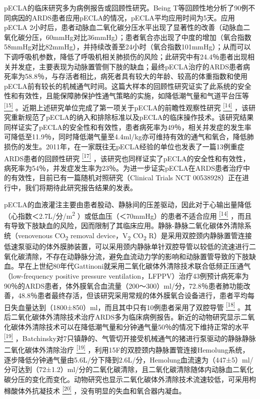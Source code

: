pECLA的临床研究多为病例报告或回顾性研究。Being
T等回顾性地分析了90例不同病因的ARDS患者应用pECLA的情况，pECLA平均应用时间为5天。应用pECLA
2小时后，患者动脉血二氧化碳分压水平出现了显著性的改善（动脉血二氧化碳分压，60mmHg对比36mmHg）；患者氧合亦出现了中度的增加（氧合指数58mmHg对比82mmHg），并持续改善至24小时（氧合指数101mmHg）；从而可以下调呼吸机参数，降低了呼吸机相关肺损伤的风险；此研究中有24.4％患者出现相关并发症，主要表现为动脉置管侧下肢的缺血；最终pECLA治疗的ARDS患者病死率为58.8％，与存活者相比，病死者具有较大的年龄、较高的体重指数和使用pECLA前有较长的机械通气时间。这篇大样本的回顾性研究证实了此系统的安全性和有效性，且能保障肺保护性通气策略的实施，如降低潮气量和气道平台压等
\protect\hyperlink{text00030.htmlux5cux23ch15-29}{\textsuperscript{{[}15{]}}}
。近期上述研究单位完成了第一项关于pECLA的前瞻性观察性研究
\protect\hyperlink{text00030.htmlux5cux23ch14-29}{\textsuperscript{{[}14{]}}}
，该研究重新规范了pECLA的纳入和排除标准以及pECLA的临床操作技术。该研究结果同样证实了pECLA的安全性和有效性，患者病死率为49％，相关并发症的发生率可降低至11.9％，同时降低潮气量至4.4ml/kg亦可维持有效的通气和氧合，降低肺损伤的发生。2011年，在一家既往无pECLA经验的单位也发表了一篇13例重症ARDS患者的回顾性研究
\protect\hyperlink{text00030.htmlux5cux23ch17-29}{\textsuperscript{{[}17{]}}}
，该研究也同样证实了pECLA的安全性和有效性，病死率为54％，并发症发生率为23％。为进一步证实pECLA在ARDS患者治疗中的有效性，目前已有一篇随机对照研究（Clinical
Trials NCT 00538928）正在进行中，我们将期待此研究报告结果的发表。

pECLA的血液灌注主要由患者股动、静脉间的压差驱动，因此对于心输出量降低（心指数＜2.7L/分/m\textsuperscript{2}
）或低血压（＜70mmHg）的患者不适合应用
\protect\hyperlink{text00030.htmlux5cux23ch14-29}{\textsuperscript{{[}14{]}}}
，而且有导致下肢缺血的风险，因而限制了其临床应用。静脉-静脉二氧化碳体外清除系统（venovenous
CO\textsubscript{2} removal device，V\textsubscript{2}
CO\textsubscript{2}
R）是采用双腔颈内静脉置管连接低速泵驱动的体外膜肺装置，可以采用颈内静脉单针双腔导管以较低的流速进行二氧化碳清除，不存在动静脉分流，避免血流动力学的影响和动脉置管导致的下肢缺血。早在上世纪80年代Gattinoni就采用二氧化碳体外清除技术联合低频正压通气（low-frequency
positive pressure
ventilation，LFPPV）治疗43例预计病死率为90％的ARDS患者，体外膜氧合血流量（200～300）ml/分，72.8％患者肺功能改善，48.8％患者最终存活，但该研究采用常规的体外膜氧合设备进行，患者平均每日失血量达到（1800±850）ml，而且其中只有10例患者采用了双腔导管
\protect\hyperlink{text00030.htmlux5cux23ch18-29}{\textsuperscript{{[}18{]}}}
。其后二氧化碳体外清除技术治疗ARDS多为临床病例报告。新近的动物研究显示二氧化碳体外清除技术可以在降低潮气量和分钟通气量50％的情况下维持正常的水平
\protect\hyperlink{text00030.htmlux5cux23ch19-29}{\textsuperscript{{[}19{]}}}
，Batchinsky对7只镇静的、气管切开接受机械通气的猪进行泵驱动的静脉静脉二氧化碳体外清除治疗
\protect\hyperlink{text00030.htmlux5cux23ch19-29}{\textsuperscript{{[}19{]}}}
，利用15F的双腔颈内静脉置管连接Hemolung系统，逐步降低分钟通气量由5.6L/分下降到2.6L/分，Hemolung血流速为（447±5）ml/分可达到（72±1.2）ml/分的二氧化碳清除，且二氧化碳清除随体内动脉血二氧化碳分压的变化而变化。动物研究也显示二氧化碳体外清除技术流速较低，可采用枸橼酸体外抗凝技术
\protect\hyperlink{text00030.htmlux5cux23ch20-29}{\textsuperscript{{[}20{]}}}
，没有明显的失血和氧合器内凝血。


